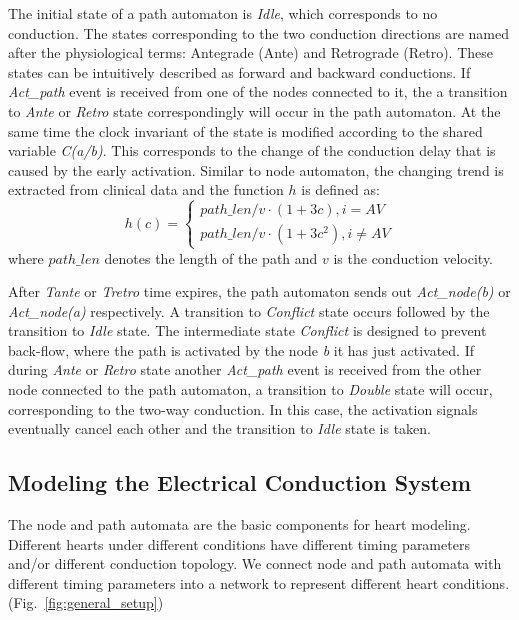\documentclass[openany]{now} %
\newcommand{\figref}[1]{Fig.~\ref{fig:#1}}
\begin{document}
The initial state of a path automaton is \emph{Idle}, which corresponds to no conduction. The states corresponding to the two conduction directions are named after the physiological terms: Antegrade (Ante) and Retrograde (Retro). These states can be intuitively described as forward and backward conductions. If \emph{Act\_path} event is received from one of the nodes connected to it, the a transition to \emph{Ante} or \emph{Retro} state correspondingly will occur in the path automaton. At the same time the clock invariant of the state is modified according to the shared variable \emph{C(a/b)}. This corresponds to the change of the conduction delay that is caused by the early activation. Similar to node automaton, the changing trend is extracted from clinical data and the function $h$ is defined as:
\begin{equation} 
						h(c) = \left\{
						\begin{array}{lr}
						
						path\_len/v\cdot (1+3c), i=AV\\
						path\_len/v\cdot (1+3c^2), i\neq AV
						\end{array}
						\right.
						\end{equation}
where $path\_len$ denotes the length of the path and $v$ is the conduction velocity.

After \emph{Tante} or \emph{Tretro} time expires, the path automaton sends out \emph{Act\_node(b)} or \emph{Act\_node(a)} respectively. A transition to \emph{Conflict} state occurs followed by the transition to \emph{Idle} state. The intermediate state \emph{Conflict} is designed to prevent back-flow, where the path is activated by the node \emph{b} it has just activated. If during \emph{Ante} or \emph{Retro} state another \emph{Act\_path} event is received from the other node connected to the path automaton, a transition to \emph{Double} state will occur, corresponding to the two-way conduction. In this case, the activation signals eventually cancel each other and the transition to \emph{Idle} state is taken.

\subsection{Modeling the Electrical Conduction System}
The node and path automata are the basic components for heart modeling. Different hearts under different conditions have different timing parameters and/or different conduction topology. We connect node and path automata with different timing parameters into a network to represent different heart conditions. (\figref{general_setup}) 
\end{document}
